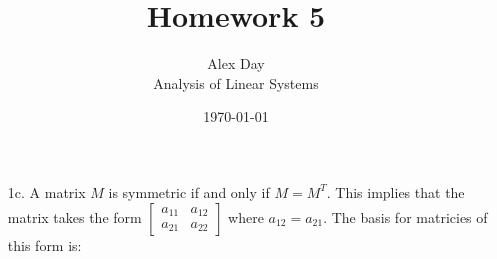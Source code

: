 \documentclass[12pt,fleqn,leqno,letterpaper]{article}
\title{Homework 5}
\author{Alex Day\\
	\small{Analysis of Linear Systems}
}
\date{\today}
\begin{document}
	\maketitle

	\begin{enumerate}
		\item[1c.] A matrix $M$ is symmetric if and only if $M = M^{T}$. This implies that the matrix takes the form
			$\begin{bmatrix}
				a_{11} & a_{12} \\
				a_{21} & a_{22}
			\end{bmatrix}$
			where $a_{12} = a_{21}$. The basis for matricies of this form is:
			\begin{center}
			\end{center}



\end{enumerate}
\end{document}
